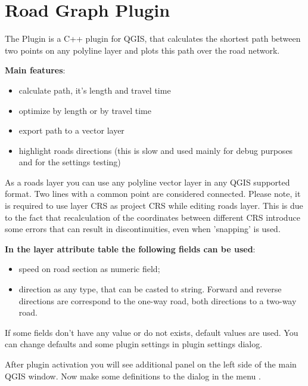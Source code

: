 
\section{Road Graph Plugin}\label{sec:roadgraph}



The  Plugin is a C++ plugin for QGIS, that calculates the shortest path 
between two points on any polyline layer and plots this path over the road network. 

\textbf{Main features}:

\begin{itemize}
\item calculate path, it's length and travel time
\item optimize by length or by travel time
\item export path to a vector layer
\item highlight roads directions (this is slow and used mainly for debug purposes and for the settings 
testing)
\end{itemize}

As a roads layer you can use any polyline vector layer in any QGIS supported format. Two lines with 
a common point are considered connected. Please note, it is required to use layer CRS as project CRS 
while editing roads layer. This is due to the fact that recalculation of the coordinates between 
different CRS introduce some errors that can result in discontinuities, even when 'snapping' is used.

\textbf{In the layer attribute table the following fields can be used}:

\begin{itemize}
\item speed on road section as numeric field;
\item direction as any type, that can be casted to string. Forward and reverse directions are correspond 
to the one-way road, both directions to a two-way road.
\end{itemize}

If some fields don't have any value or do not exists, default values are used. You can change defaults 
and some plugin settings in plugin settings dialog.


After plugin activation you will see additional panel on the left side of the main QGIS window. Now 
make some definitions to the  dialog in the menu 
 \arrow {}. 


